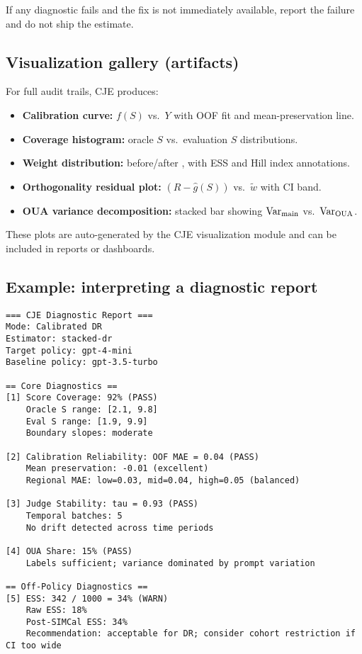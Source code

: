 \begin{enumerate}[resume]
If any diagnostic fails and the fix is not immediately available, report the failure and do not ship the estimate.

\subsection{Visualization gallery (artifacts)}

For full audit trails, CJE produces:
\begin{itemize}
\item \textbf{Calibration curve:} $f(S)$ vs.\ $Y$ with OOF fit and mean-preservation line.
\item \textbf{Coverage histogram:} oracle $S$ vs.\ evaluation $S$ distributions.
\item \textbf{Weight distribution:} before/after \simcal, with ESS and Hill index annotations.
\item \textbf{Orthogonality residual plot:} $(R - \hat{g}(S))$ vs.\ $\tilde{w}$ with CI band.
\item \textbf{OUA variance decomposition:} stacked bar showing $\operatorname{Var}_{\text{main}}$ vs.\ $\operatorname{Var}_{\text{OUA}}$.
\end{itemize}

These plots are auto-generated by the CJE visualization module and can be included in reports or dashboards.

\subsection{Example: interpreting a diagnostic report}

\begin{lstlisting}
=== CJE Diagnostic Report ===
Mode: Calibrated DR
Estimator: stacked-dr
Target policy: gpt-4-mini
Baseline policy: gpt-3.5-turbo

== Core Diagnostics ==
[1] Score Coverage: 92% (PASS)
    Oracle S range: [2.1, 9.8]
    Eval S range: [1.9, 9.9]
    Boundary slopes: moderate

[2] Calibration Reliability: OOF MAE = 0.04 (PASS)
    Mean preservation: -0.01 (excellent)
    Regional MAE: low=0.03, mid=0.04, high=0.05 (balanced)

[3] Judge Stability: tau = 0.93 (PASS)
    Temporal batches: 5
    No drift detected across time periods

[4] OUA Share: 15% (PASS)
    Labels sufficient; variance dominated by prompt variation

== Off-Policy Diagnostics ==
[5] ESS: 342 / 1000 = 34% (WARN)
    Raw ESS: 18%
    Post-SIMCal ESS: 34%
    Recommendation: acceptable for DR; consider cohort restriction if CI too wide


\end{lstlisting}
\end{enumerate}
